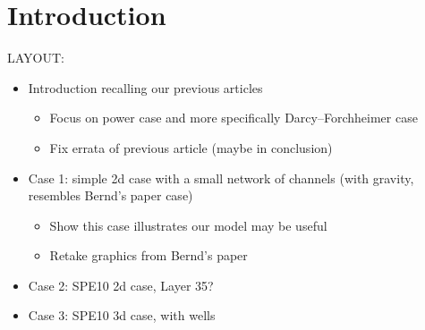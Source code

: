 \section{Introduction}
\label{sec:introduction}

LAYOUT:
\begin{itemize}
  \item Introduction recalling our previous articles
  \begin{itemize}
    \item Focus on power case and more specifically Darcy--Forchheimer case
    \item Fix errata of previous article (maybe in conclusion)
  \end{itemize}
  \item Case 1: simple 2d case with a small network of channels (with gravity, resembles Bernd's paper case)
  \begin{itemize}
    \item Show this case illustrates our model may be useful
    \item Retake graphics from Bernd's paper
  \end{itemize}
  \item Case 2: SPE10 2d case, Layer 35?
  \item Case 3: SPE10 3d case, with wells
\end{itemize}





